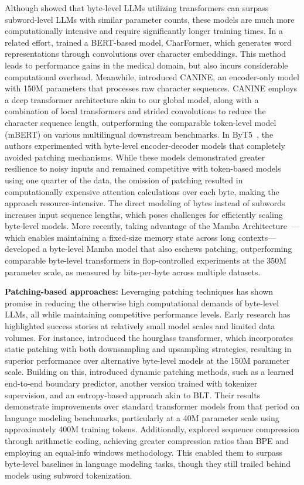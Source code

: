 Although \cite{Choe2019BridgingTG} showed that byte-level LLMs utilizing transformers can surpass subword-level LLMs with similar parameter counts, these models are much more computationally intensive and require significantly longer training times. In a related effort, \cite{el2020characterbert} trained a BERT-based model, CharFormer, which generates word representations through convolutions over character embeddings. This method leads to performance gains in the medical domain, but also incurs considerable computational overhead. Meanwhile, \cite{clark2022canine} introduced CANINE, an encoder-only model with 150M parameters that processes raw character sequences. CANINE employs a deep transformer architecture akin to our global model, along with a combination of local transformers and strided convolutions to reduce the character sequence length, outperforming the comparable token-level model (mBERT) on various multilingual downstream benchmarks. In ByT5~\citep{xue2022byt5}, the authors experimented with byte-level encoder-decoder models that completely avoided patching mechanisms. While these models demonstrated greater resilience to noisy inputs and remained competitive with token-based models using one quarter of the data, the omission of patching resulted in computationally expensive attention calculations over each byte, making the approach resource-intensive. The direct modeling of bytes instead of subwords increases input sequence lengths, which poses challenges for efficiently scaling byte-level models. More recently, taking advantage of the Mamba Architecture~\citep{gu2023mamba}—which enables maintaining a fixed-size memory state across long contexts—\cite{wang2024mambabyte} developed a byte-level Mamba model that also eschews patching, outperforming comparable byte-level transformers in flop-controlled experiments at the 350M parameter scale, as measured by bits-per-byte across multiple datasets.

\textbf{Patching-based approaches:} Leveraging patching techniques has shown promise in reducing the otherwise high computational demands of byte-level LLMs, all while maintaining competitive performance levels. Early research has highlighted success stories at relatively small model scales and limited data volumes. For instance, \cite{nawrot-etal-2022-hierarchical} introduced the hourglass transformer, which incorporates static patching with both downsampling and upsampling strategies, resulting in superior performance over alternative byte-level models at the 150M parameter scale. Building on this, \cite{nawrot-etal-2023-efficient} introduced dynamic patching methods, such as a learned end-to-end boundary predictor, another version trained with tokenizer supervision, and an entropy-based approach akin to {\textsc BLT}. Their results demonstrate improvements over standard transformer models from that period on language modeling benchmarks, particularly at a 40M parameter scale using approximately 400M training tokens. Additionally, \cite{lester2024training} explored sequence compression through arithmetic coding, achieving greater compression ratios than BPE and employing an equal-info windows methodology. This enabled them to surpass byte-level baselines in language modeling tasks, though they still trailed behind models using subword tokenization.

